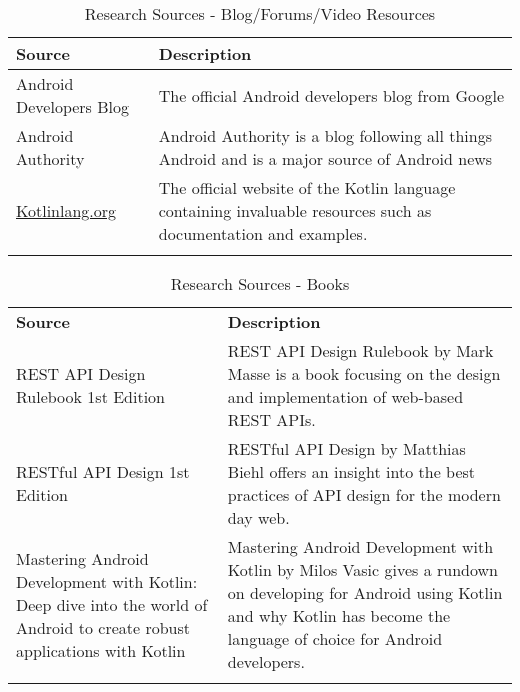 \begin{longtable}{ |p{4cm}|p{10cm}|  }
		\hline
		\hline
		\textbf{Source} & \textbf{Description} \\
		\hline
		Android Developers Blog & The official Android developers blog from Google\cite{androiddevblogref}\\
		\hline
		Android Authority & Android Authority\cite{androidauthorityref} is a blog following all things Android and is a major source of Android news\\
		\hline
		\url{Kotlinlang.org} & The official website of the Kotlin language containing invaluable resources such as documentation and examples\cite{Kotlinref}.\\
		\hline
    \caption{Research Sources - Blog/Forums/Video Resources}
	\label{blogsandforumstable}
\end{longtable}

\begin{longtable}{ |p{4cm}|p{10cm}|  }
		\hline
		\textbf{Source} & \textbf{Description} \\
		REST API Design Rulebook 1st Edition & REST API Design Rulebook by Mark Masse\cite{restapidesignrulebook} is a book focusing on the design and implementation of web-based REST APIs.\\
		\hline
		RESTful API Design 1st Edition & RESTful API Design by Matthias Biehl\cite{restfulapidesign} offers an insight into the best practices of API design for the modern day web.\\
		\hline
		Mastering Android Development with Kotlin: Deep dive into the world of Android to create robust applications with Kotlin & Mastering Android Development with Kotlin by Milos Vasic\cite{androidkotlindevbook} gives a rundown on developing for Android using Kotlin and why Kotlin has become the language of choice for Android developers.\\
		\hline
    \caption{Research Sources - Books}
	\label{bookstable}
\end{longtable}


